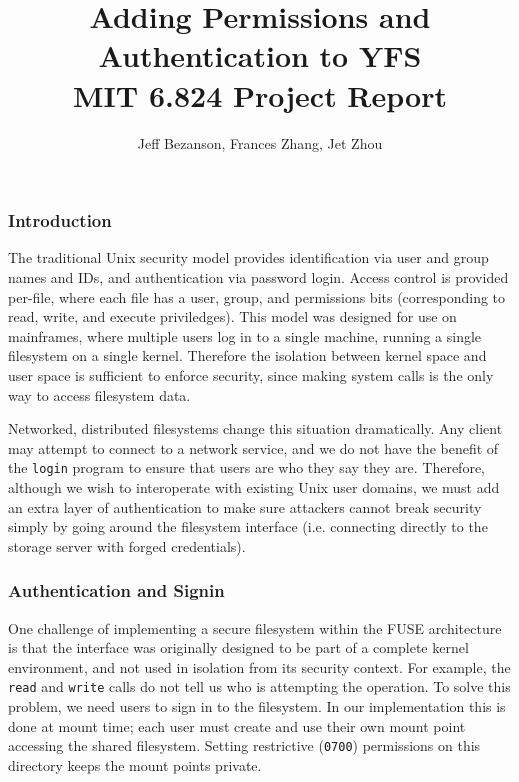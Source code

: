 \documentclass[12pt]{article}
\title{Adding Permissions and Authentication to YFS \\ MIT 6.824 Project Report}
\author{Jeff Bezanson, Frances Zhang, Jet Zhou}
\begin{document}
\maketitle

\setcounter{secnumdepth}{1}

\subsubsection{Introduction}

The traditional Unix security model provides identification via user
and group names and IDs, and authentication via password login.
Access control is provided per-file, where each file
has a user, group, and permissions bits (corresponding to read, write,
and execute priviledges). This model was designed for use on mainframes,
where multiple users log in to a single machine, running a single
filesystem on a single kernel. Therefore the isolation between kernel
space and user space is sufficient to enforce security, since making
system calls is the only way to access filesystem data.

Networked, distributed filesystems change this situation dramatically.
Any client may attempt to connect to a network service, and we do not
have the benefit of the {\tt login} program to ensure that users are
who they say they are. Therefore, although we wish to interoperate with
existing Unix user domains, we must add an extra layer of authentication
to make sure attackers cannot break security simply by going around the
filesystem interface (i.e. connecting directly to the storage server
with forged credentials).

\subsubsection{Authentication and Signin}

One challenge of implementing a secure filesystem within the FUSE
architecture is that the interface was originally designed to be
part of a complete kernel environment, and not used in isolation from
its security context. For example, the {\tt read}
and {\tt write} calls do not tell us who is attempting the operation.
To solve this problem, we need users to sign in to the filesystem.
In our implementation this is done at mount time; each user must
create and use their own mount point accessing the shared filesystem.
Setting restrictive ({\tt 0700}) permissions on this directory keeps
the mount points private.
\end{document}
